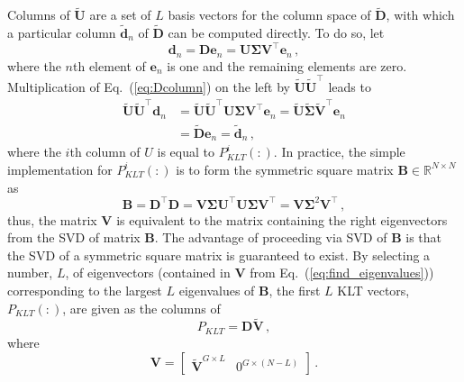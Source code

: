 \documentclass[5p,times,twocolumn,10pt]{elsarticle}
\newcommand{\EQ}[1]{Eq.~(\ref{#1})}               %
\begin{document}
    Columns of $\tilde{\mathbf{U}}$ are a set of $L$ basis vectors for the
    column space of $\tilde{\mathbf{D}}$, with which a particular column
    $\tilde{\mathbf{d}}_n$ of $\tilde{\mathbf{D}}$ can be computed directly.  To
    do so, let
    \begin{equation}
        \mathbf{d}_n = \mathbf{D} \mathbf{e}_n = \mathbf{U}\bm{\Sigma}
        \mathbf{V}^{\intercal} \mathbf{e}_n  \, ,
        \label{eq:Dcolumn}
    \end{equation}
    where the $n$th element of $\mathbf{e}_n$ is one and the remaining elements
    are zero. Multiplication of \EQ{eq:Dcolumn} on the left by
    $\tilde{\mathbf{U}} \tilde{\mathbf{U}}^{\intercal}$ leads to
    \begin{equation}
        \begin{split}
            \tilde{\mathbf{U}} \tilde{\mathbf{U}}^{\intercal} \mathbf{d}_n
            &= \tilde{\mathbf{U}}\tilde{\mathbf{U}}^{\intercal}
            \mathbf{U}\bm{\Sigma} \mathbf{V}^{\intercal} \mathbf{e}_n
            = \tilde{\mathbf{U}} \tilde{\bm{\Sigma}}
            \tilde{\mathbf{V}}^{\intercal} \mathbf{e}_n \\
            &= \tilde{\mathbf{D}} \mathbf{e}_n
            = \tilde{\mathbf{d}}_n \, ,
        \end{split}
    \end{equation}
    where the $i$th column of $U$ is equal to $P^i_{KLT}(:)$.  In practice, the
    simple implementation for $P^i_{KLT}(:)$ is to form the symmetric square
    matrix $\mathbf{B} \in \mathbb{R}^{N\times N}$  as
    \begin{equation}
        \mathbf{B} = \mathbf{D}^{\intercal}\mathbf{D}  = \mathbf{V}
        \mathbf{\Sigma}
        \mathbf{U}^{\intercal} \mathbf{U} \mathbf{\Sigma} \mathbf{V}^{\intercal}
        =
        \mathbf{V} \mathbf{\Sigma}^2 \mathbf{V}^{\intercal} \, ,
        \label{eq:find_eigenvalues}
    \end{equation}
    thus, the matrix $\mathbf{V}$ is equivalent to the matrix containing the
    right eigenvectors from the SVD of matrix $\mathbf{B}$.  The advantage of
    proceeding via SVD of $\mathbf{B}$ is that the SVD of a symmetric square
    matrix is guaranteed to exist. By selecting a number, $L$, of eigenvectors
    (contained in $\mathbf{V}$ from \EQ{eq:find_eigenvalues}) corresponding to
    the largest $L$ eigenvalues of $\mathbf{B}$, the first $L$ KLT vectors,
    $P_{KLT}(:)$, are given as the columns of
    \begin{equation}
        P_{KLT} = \mathbf{D} \tilde{\mathbf{V}} \, ,
    \end{equation}
    where
    \begin{equation*}
        \mathbf{V} = \left[ \begin{array}{cc}
            \tilde{\mathbf{V}}^{G\times L} &
            0^{G\times (N-L)}  \end{array} \right] \, .
    \end{equation*}
\end{document}
